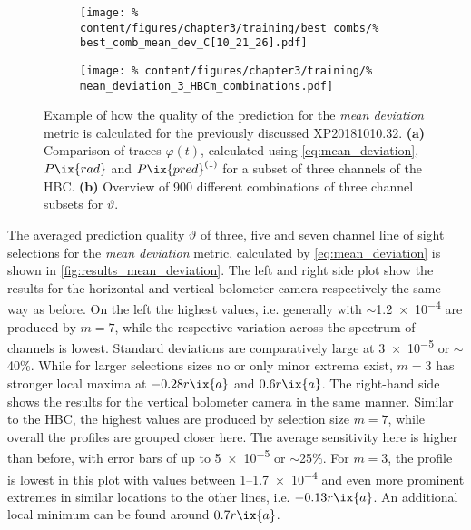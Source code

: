 %
                \begin{figure}[t]%
                    \centering%
                    \begin{subfigure}{0.47\textwidth}%
                        \texttt{[image: \%
                            content/figures/chapter3/training/best\_combs/\%
                            best\_comb\_mean\_dev\_C[10\_21\_26].pdf]}%
                        \caption{}%
                    \end{subfigure}%
                    \hfill%
                    \begin{subfigure}{0.47\textwidth}%
                        \texttt{[image: \%
                            content/figures/chapter3/training/\%
                            mean\_deviation\_3\_HBCm\_combinations.pdf]}%
                        \caption{}%
                    \end{subfigure}%
                    \caption{Example of how the quality of the prediction for the \textit{mean deviation} metric is calculated for the previously discussed XP20181010.32. \textbf{(a)} Comparison of traces $\varphi\left(t\right)$, calculated using \cref{eq:mean_deviation}, $P\ix{rad}$ and $P\ix{pred}^{\left(1\right)}$ for a subset of three channels of the HBC. \textbf{(b)} Overview of 900 different combinations of three channel subsets for $\vartheta$.}\label{fig:mean_deviation}%
                \end{figure}%
%
                The averaged prediction quality $\vartheta$ of three, five and seven channel line of sight selections for the \textit{mean deviation} metric, calculated by \cref{eq:mean_deviation} is shown in \cref{fig:results_mean_deviation}. The left and right side plot show the results for the horizontal and vertical bolometer camera respectively the same way as before. On the left the highest values, i.e. generally with $\sim$\SI{1.2e-4}{\arbitraryunit} are produced by $m=7$, while the respective variation across the spectrum of channels is lowest. Standard deviations are comparatively large at \SI{3e-5}{\arbitraryunit} or $\sim$40\%. While for larger selections sizes no or only minor extrema exist, $m=3$ has stronger local maxima at $-0.28r\ix{a}$ and $0.6r\ix{a}$. The right-hand side shows the results for the vertical bolometer camera in the same manner. Similar to the HBC, the highest values are produced by selection size $m=7$, while overall the profiles are grouped closer here. The average sensitivity here is higher than before, with error bars of up to \SI{5e-5}{\arbitraryunit} or $\sim$25\%. For $m=3$, the profile is lowest in this plot with values between \SIrange{1}{1.7e-4}{\arbitraryunit} and even more prominent extremes in similar locations to the other lines, i.e. $-0.13r\ix{a}$. An additional local minimum can be found around $0.7r\ix{a}$.\\%
